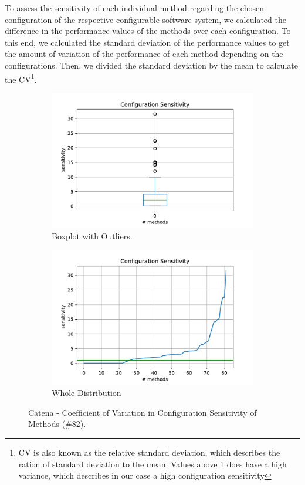 To assess the sensitivity of each individual method regarding the chosen configuration of the respective configurable software system, we calculated the difference in the performance values of the methods over each configuration. To this end, we calculated the standard deviation of the performance values to get the amount of variation of the performance of each method depending on the configurations. Then, we divided the standard deviation by the mean to calculate the \ac{CV}\footnote{\ac{CV} is also known as the relative standard deviation, which describes the ration of standard deviation to the mean. Values above 1 does have a high variance, which describes in our case a high configuration sensitivity}.

\begin{figure}[h]
	\centering
	\begin{subfigure}{.5\textwidth}
	  \centering
	  \includegraphics[width=.99\linewidth]{images/Catena_box_conf_sens_cv_with_outl}
	  \caption{Boxplot with Outliers.}
	  \label{fig:c_conf_sens_on_method:sub1}
	\end{subfigure}%
	\begin{subfigure}{.5\textwidth}
	  \centering
	  \includegraphics[width=.99\linewidth]{images/catena_plt_conf_sens_cv_with_outl}
	  \caption{Whole Distribution}
	  \label{fig:c_conf_sens_on_method:sub2}
	\end{subfigure}
	\caption{Catena - Coefficient of Variation in Configuration Sensitivity of Methods (\#82).}
	\label{fig:c_conf_sens_on_method}
\end{figure}


